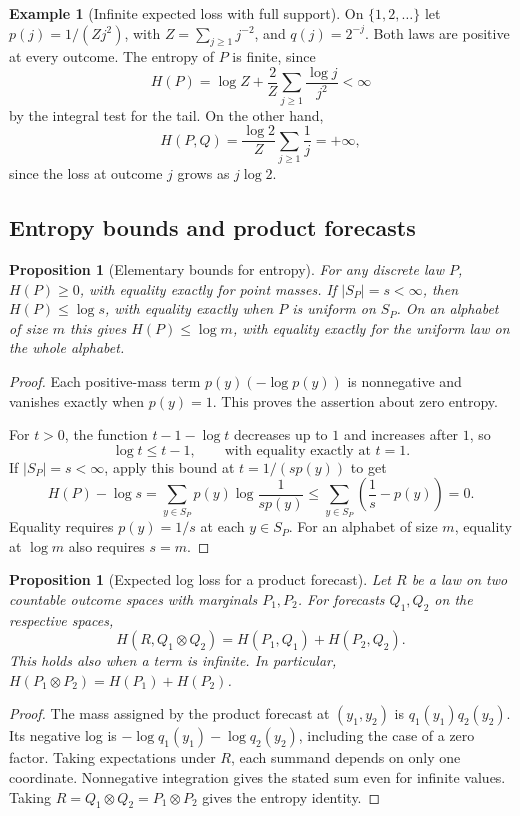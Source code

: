 \documentclass[11pt,oneside]{book}
\newtheorem{proposition}[theorem]{Proposition}
\theoremstyle{definition}
\newtheorem{example}[theorem]{Example}
\theoremstyle{remark}
\begin{document}
\begin{example}[Infinite expected loss with full support]
\label{ex:infinite-cross-entropy-full-support}
On $\{1,2,\ldots\}$ let $p(j)=1/(Zj^2)$, with
$Z=\sum_{j\geq1}j^{-2}$, and $q(j)=2^{-j}$. Both laws are positive
at every outcome. The entropy of $P$ is finite, since
\[
H(P)=\log Z+\frac{2}{Z}\sum_{j\geq1}\frac{\log j}{j^2}<\infty
\]
by the integral test for the tail. On the other hand,
\[
H(P,Q)=\frac{\log 2}{Z}\sum_{j\geq1}\frac1j=+\infty,
\]
since the loss at outcome $j$ grows as $j\log 2$.
\end{example}

\subsection{Entropy bounds and product forecasts}
\label{subsec:entropy-bounds-products}

\begin{proposition}[Elementary bounds for entropy]
\label{prop:discrete-entropy-bounds}
For any discrete law $P$, $H(P)\geq0$, with equality exactly for point
masses. If $|S_P|=s<\infty$, then $H(P)\leq\log s$, with equality
exactly when $P$ is uniform on $S_P$. On an alphabet of size $m$ this
gives $H(P)\leq\log m$, with equality exactly for the uniform law
on the whole alphabet.
\end{proposition}
\begin{proof}
Each positive-mass term $p(y)(-\log p(y))$ is nonnegative and vanishes
exactly when $p(y)=1$. This proves the assertion about zero entropy.

For $t>0$, the function $t-1-\log t$ decreases up to $1$ and increases
after $1$, so
\begin{equation}
\log t\leq t-1,\qquad\text{with equality exactly at }t=1.
\label{eq:log-tangent-bound}
\end{equation}
If $|S_P|=s<\infty$, apply this bound at $t=1/(sp(y))$ to get
\[
H(P)-\log s
=\sum_{y\in S_P}p(y)\log\frac1{sp(y)}
\leq\sum_{y\in S_P}\left(\frac1s-p(y)\right)=0.
\]
Equality requires $p(y)=1/s$ at each $y\in S_P$. For an alphabet of
size $m$, equality at $\log m$ also requires $s=m$.
\end{proof}

\begin{proposition}[Expected log loss for a product forecast]
\label{prop:product-forecast-cross-entropy}
Let $R$ be a law on two countable outcome spaces with marginals
$P_1,P_2$. For forecasts $Q_1,Q_2$ on the respective spaces,
\[
H(R,Q_1\otimes Q_2)=H(P_1,Q_1)+H(P_2,Q_2).
\]
This holds also when a term is infinite. In particular,
$H(P_1\otimes P_2)=H(P_1)+H(P_2)$.
\end{proposition}
\begin{proof}
The mass assigned by the product forecast at $(y_1,y_2)$ is
$q_1(y_1)q_2(y_2)$. Its negative log is
$-\log q_1(y_1)-\log q_2(y_2)$, including the case of a zero factor.
Taking expectations under $R$, each summand depends on only one
coordinate. Nonnegative integration gives the stated sum even for
infinite values. Taking $R=Q_1\otimes Q_2=P_1\otimes P_2$ gives
the entropy identity.
\end{proof}
\end{document}
